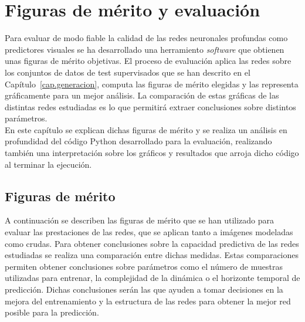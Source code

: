 \chapter{Figuras de mérito y evaluación}\label{cap.evaluacion}

Para evaluar de modo fiable la calidad de las redes neuronales profundas como predictores visuales se ha desarrollado una herramiento \textit{software} que obtienen unas figuras de mérito objetivas. El proceso de evaluación aplica las redes sobre los conjuntos de datos de test supervisados que se han descrito en el Capítulo~\ref{cap.generacion}, computa las figuras de mérito elegidas y las representa gráficamente para un mejor análisis. La comparación de estas gráficas de las distintas redes estudiadas es lo que permitirá extraer conclusiones sobre distintos parámetros.\\

En este capítulo se explican dichas figuras de mérito y se realiza un análisis en profundidad del código Python desarrollado para la evaluación, realizando también  una interpretación sobre los gráficos y resultados que arroja dicho código al terminar la ejecución.

\section{Figuras de mérito}

A continuación se describen las figuras de mérito que se han utilizado para evaluar las prestaciones de las redes, que se aplican tanto a imágenes modeladas como crudas. Para obtener conclusiones sobre la capacidad predictiva de las redes estudiadas se realiza una comparación entre dichas medidas. Estas comparaciones permiten obtener conclusiones sobre parámetros como el número de muestras utilizadas para entrenar, la complejidad de la dinámica o el horizonte temporal de predicción. Dichas conclusiones serán las que ayuden a tomar decisiones en la mejora del entrenamiento y la estructura de las redes para obtener la mejor red posible para la predicción.

